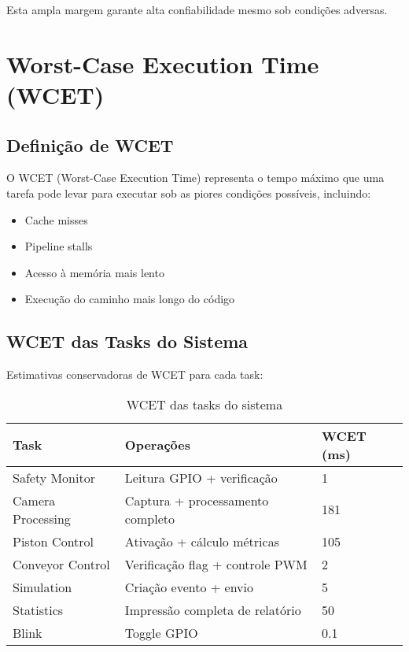 \documentclass[12pt,a4paper]{article}
\begin{document}
Esta ampla margem garante alta confiabilidade mesmo sob condições adversas.

\section{Worst-Case Execution Time (WCET)}

\subsection{Definição de WCET}

O WCET (Worst-Case Execution Time) representa o tempo máximo que uma tarefa pode levar para executar sob as piores condições possíveis, incluindo:
\begin{itemize}
    \item Cache misses
    \item Pipeline stalls
    \item Acesso à memória mais lento
    \item Execução do caminho mais longo do código
\end{itemize}

\subsection{WCET das Tasks do Sistema}

Estimativas conservadoras de WCET para cada task:

\begin{table}[H]
\centering
\begin{tabularx}{\textwidth}{lXl}
\toprule
\textbf{Task} & \textbf{Operações} & \textbf{WCET (ms)} \\
\midrule
Safety Monitor & Leitura GPIO + verificação & 1 \\
Camera Processing & Captura + processamento completo & 181 \\
Piston Control & Ativação + cálculo métricas & 105 \\
Conveyor Control & Verificação flag + controle PWM & 2 \\
Simulation & Criação evento + envio & 5 \\
Statistics & Impressão completa de relatório & 50 \\
Blink & Toggle GPIO & 0.1 \\
\bottomrule
\end{tabularx}
\caption{WCET das tasks do sistema}
\end{table}
\end{document}

